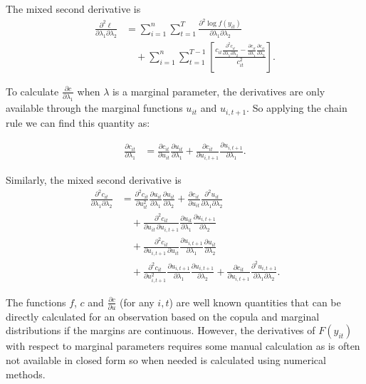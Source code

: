 \documentclass{article}
\begin{document}
The mixed second derivative is
\begin{align*}
\frac{\partial^2 \ell}
{\partial \lambda_1 \partial \lambda_2}
&=
\sum_{i=1}^{n}\sum_{t=1}^{T}
\frac{\partial^2 \log f(y_{it})}
{\partial \lambda_1 \partial \lambda_2}
\\
&\quad+
\sum_{i=1}^{n}\sum_{t=1}^{T-1}
\left[
\frac{
c_{it}
\displaystyle\frac{\partial^2 c_{it}}
{\partial \lambda_1 \partial \lambda_2}
-
\displaystyle\frac{\partial c_{it}}{\partial \lambda_1}
\displaystyle\frac{\partial c_{it}}{\partial \lambda_2}
}
{c_{it}^2}
\right].
\end{align*}

To calculate $\frac{\partial c}{\partial\lambda_1}$ when $\lambda$ is a marginal parameter, the derivatives are only available through the marginal functions $u_{it}$ and $u_{i,t+1}$. So applying the chain rule we can find this quantity as:

\begin{align*}
\frac{\partial c_{it}}{\partial \lambda_1}
&=
\frac{\partial c_{it}}{\partial u_{it}}
\frac{\partial u_{it}}{\partial \lambda_1}
+
\frac{\partial c_{it}}{\partial u_{i,t+1}}
\frac{\partial u_{i,t+1}}{\partial \lambda_1}.
\end{align*}

Similarly, the mixed second derivative is
\begin{align*}
\frac{\partial^2 c_{it}}
{\partial \lambda_1 \partial \lambda_2}
&=
\frac{\partial^2 c_{it}}{\partial u_{it}^2}
\frac{\partial u_{it}}{\partial \lambda_1}
\frac{\partial u_{it}}{\partial \lambda_2}
+
\frac{\partial c_{it}}{\partial u_{it}}
\frac{\partial^2 u_{it}}
{\partial \lambda_1 \partial \lambda_2}
\\
&\quad+
\frac{\partial^2 c_{it}}
{\partial u_{it}\,\partial u_{i,t+1}}
\frac{\partial u_{it}}{\partial \lambda_1}
\frac{\partial u_{i,t+1}}{\partial \lambda_2}
\\
&\quad+
\frac{\partial^2 c_{it}}
{\partial u_{i,t+1}\,\partial u_{it}}
\frac{\partial u_{i,t+1}}{\partial \lambda_1}
\frac{\partial u_{it}}{\partial \lambda_2}
\\
&\quad+
\frac{\partial^2 c_{it}}{\partial u_{i,t+1}^2}
\frac{\partial u_{i,t+1}}{\partial \lambda_1}
\frac{\partial u_{i,t+1}}{\partial \lambda_2}
+
\frac{\partial c_{it}}{\partial u_{i,t+1}}
\frac{\partial^2 u_{i,t+1}}
{\partial \lambda_1 \partial \lambda_2}.
\end{align*}

The functions $f$, $c$ and $\frac{\partial c}{ \partial u}$ (for any $i,t$) are well known quantities that can be directly calculated for an observation based on the copula and marginal distributions if the margins are continuous. However, the derivatives of $F(y_{it})$ with respect to marginal parameters requires some manual calculation as is often not available in closed form so when needed is calculated using numerical methods.
\end{document}
